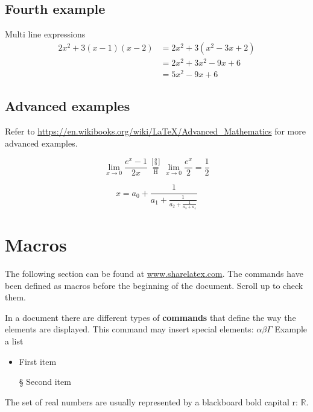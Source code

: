 \documentclass[tog]{acmsiggraph}
\newcommand{\R}{\mathbb{R}}
\newcommand{\bb}[1]{\mathbb{#1}}
\newcommand{\plusbinomial}[3][2]{(#2 + #3)^#1}
\begin{document}
\subsection{Fourth example}
Multi line expressions
\begin{align}
2x^2 + 3(x-1)(x-2) & = 2x^2 + 3(x^2-3x+2)\\ \nonumber &= 2x^2 + 3x^2 - 9x + 6\\ &= 5x^2 - 9x + 6
\end{align}

\subsection{Advanced examples}
Refer to \url{https://en.wikibooks.org/wiki/LaTeX/Advanced\_Mathematics} for more advanced examples.

\[
\lim_{x\to 0}{\frac{e^x-1}{2x}}
\overset{\left[\frac{0}{0}\right]}{\underset{\mathrm{H}}{=}}
\lim_{x\to 0}{\frac{e^x}{2}}={\frac{1}{2}}
\]

\begin{equation}
x = a_0 + \frac{1}{\displaystyle a_1 
	+ \frac{1}{\displaystyle a_2 
		+ \frac{1}{\displaystyle a_3 + a_4}}}
\end{equation}

\section{Macros}
The following section can be found at \url{www.sharelatex.com}.
The commands have been defined as macros before the beginning of the document. Scroll up to check them.


In a document there are different types of \textbf{commands} that define the way the
elements are displayed. This command may insert special elements: $\alpha \beta \Gamma$
Example a list
\begin{itemize}
	\item First item
	\item[\S] Second item
\end{itemize}
The set of real numbers are usually represented by a blackboard bold capital r: \( \R \). 
\end{document}
